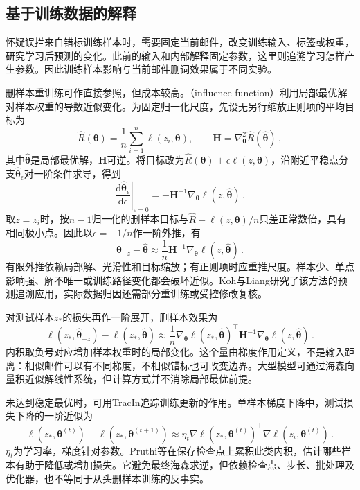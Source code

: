 \subsection{基于训练数据的解释}
\label{sec:interpretability-local-training}

怀疑误拦来自错标训练样本时，需要固定当前邮件，改变训练输入、标签或权重，研究学习后预测的变化。此前的输入和内部解释固定参数，这里则追溯学习怎样产生参数。因此训练样本影响与当前邮件删词效果属于不同实验。

删样本重训练可作直接参照，但成本较高。（influence function）利用局部最优解对样本权重的导数近似变化。为固定归一化尺度，先设无另行缩放正则项的平均目标为
\[
 \hat R(\bm{\theta})=\frac1n\sum_{i=1}^n\ell(z_i,\bm{\theta}),
 \qquad
 \bm H=\nabla_{\bm{\theta}}^2\hat R(\hat{\bm{\theta}})\, ,
\]
其中$\hat{\bm\theta}$是局部最优解，$\bm H$可逆。将目标改为$\hat R(\bm\theta)+\epsilon\ell(z,\bm\theta)$，沿附近平稳点分支$\hat{\bm\theta}_\epsilon$对一阶条件求导，得到
\[
 \left.\frac{\mathrm d\hat{\bm{\theta}}_\epsilon}
 {\mathrm d\epsilon}\right|_{\epsilon=0}
 =-\bm H^{-1}\nabla_{\bm{\theta}}
       \ell(z,\hat{\bm{\theta}})\, .
\]
取$z=z_i$时，按$n-1$归一化的删样本目标与$\hat R-\ell(z,\bm\theta)/n$只差正常数倍，具有相同极小点。因此以$\epsilon=-1/n$作一阶外推，有
\[
 \hat{\bm{\theta}}_{-z}-\hat{\bm{\theta}}
 \approx\frac1n\bm H^{-1}\nabla_{\bm{\theta}}
 \ell(z,\hat{\bm{\theta}})\, .
\]
有限外推依赖局部解、光滑性和目标缩放；有正则项时应重推尺度。样本少、单点影响强、解不唯一或训练路径变化都会破坏近似。Koh与Liang研究了该方法的预测追溯应用，实际数据归因还需部分重训练或受控修改复核。

对测试样本$z_*$的损失再作一阶展开，删样本效果为
\[
 \ell(z_*,\hat{\bm{\theta}}_{-z})
 -\ell(z_*,\hat{\bm{\theta}})
 \approx\frac1n\nabla_{\bm\theta}\ell(z_*,\hat{\bm\theta})^\top
 \bm H^{-1}\nabla_{\bm\theta}\ell(z,\hat{\bm\theta})\, .
\]
内积取负号对应增加样本权重时的局部变化。这个量由梯度作用定义，不是输入距离：相似邮件可以有不同梯度，不相似错标也可改变边界。大型模型可通过海森向量积近似解线性系统，但计算方式并不消除局部最优前提。

未达到稳定最优时，可用TracIn追踪训练更新的作用。单样本梯度下降中，测试损失下降的一阶近似为
\[
 \ell(z_*,\bm\theta^{(t)})-\ell(z_*,\bm\theta^{(t+1)})
 \approx\eta_t
 \nabla\ell(z_*,\bm\theta^{(t)})^\top
 \nabla\ell(z_i,\bm\theta^{(t)})\, .
\]
$\eta_t$为学习率，梯度针对参数。Pruthi等在保存检查点上累积此类内积，估计哪些样本有助于降低或增加损失。它避免最终海森求逆，但依赖检查点、步长、批处理及优化器，也不等同于从头删样本训练的反事实。

